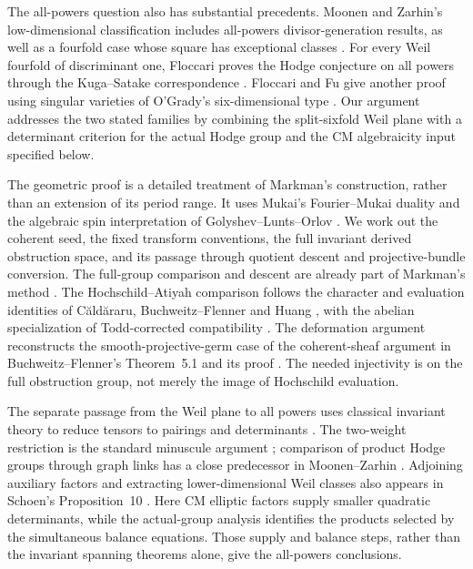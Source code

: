 \documentclass[11pt]{article}
\numberwithin{equation}{section}
\begin{document}
The all-powers question also has substantial precedents. Moonen and
Zarhin's low-dimensional classification includes all-powers
divisor-generation results, as well as a fourfold case whose square has
exceptional classes \cite[Theorems~0.1--0.2]{MoonenZarhin1999}.
For every Weil fourfold of discriminant one, Floccari proves the Hodge
conjecture on all powers through the Kuga--Satake correspondence
\cite[Theorems~1.3 and~5.12]{Floccari2026K3}.
Floccari and Fu give another proof using singular varieties of
O'Grady's six-dimensional type \cite[Theorem~1.2]{FloccariFu2026}.
Our argument addresses the two stated families by combining the
split-sixfold Weil plane with a determinant criterion for the actual
Hodge group and the CM algebraicity input specified below.

The geometric proof is a detailed treatment of Markman's construction,
rather than an extension of its period range. It uses Mukai's
Fourier--Mukai duality and the algebraic spin interpretation of
Golyshev--Lunts--Orlov \cite{P3SWMukai1981,GolyshevLuntsOrlov2001}.
We work out the coherent seed, the fixed transform conventions, the full
invariant derived obstruction space, and its passage through quotient
descent and projective-bundle conversion. The full-group comparison and
descent are already part of Markman's method
\cite[Section~7.4.2 and Lemmas~9.3.2 and~9.3.11]{Markman2025Secant}
\cite[Sections~11.3--11.5]{Markman2026ICM}.
The Hochschild--Atiyah comparison follows the character and evaluation
identities of C\u{a}ld\u{a}raru, Buchweitz--Flenner and Huang
\cite{P3HHCaldararuII,P3HHBF,P3HHHuang}, with the abelian specialization
of Todd-corrected compatibility \cite{P3HHCRVdB}.
The deformation argument reconstructs the smooth-projective-germ case
of the coherent-sheaf argument in Buchweitz--Flenner's Theorem~5.1 and
its proof \cite{P3SWBuchweitzFlenner2003}. The needed injectivity is on
the full obstruction group, not merely the image of Hochschild evaluation.

The separate passage from the Weil plane to all powers uses classical
invariant theory to reduce tensors to pairings and determinants
\cite{LehrerZhang2015,LehrerZhang2017,Schrijver2008}.
The two-weight restriction is the standard minuscule argument
\cite[Section~3.2, Lemmas~4--5]{Serre1979HodgeTate}; comparison of product
Hodge groups through graph links has a close predecessor in
Moonen--Zarhin \cite[Section~3.1 and Lemmas~3.3--3.4]{MoonenZarhin1999}.
Adjoining auxiliary factors and extracting lower-dimensional Weil classes
also appears in Schoen's Proposition~10 \cite{Schoen1998Addendum}.
Here CM elliptic factors supply smaller quadratic determinants, while
the actual-group analysis identifies the products selected by the
simultaneous balance equations. Those supply and balance steps, rather
than the invariant spanning theorems alone, give the all-powers conclusions.
\end{document}
